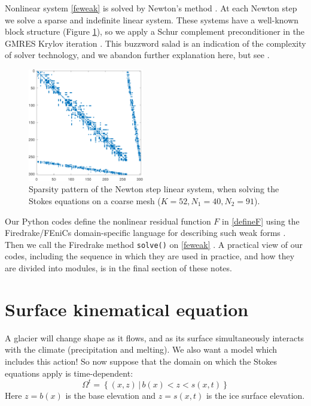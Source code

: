 \documentclass[letterpaper,final,12pt,reqno]{amsart}
\begin{document}
Nonlinear system \eqref{feweak} is solved by Newton's method \cite{Bueler2021,Kelley2003}.  At each Newton step we solve a sparse and indefinite linear system.  These systems have a well-known block structure (Figure \ref{fig:lowspy}), so we apply a Schur complement preconditioner in the GMRES Krylov iteration \cite{Elmanetal2014,GolubVanLoan2013}.  This buzzword salad is an indication of the complexity of solver technology, and we abandon further explanation here, but see \cite[Chapter 14]{Bueler2021}.

\begin{figure}[h]
\includegraphics[width=0.45\textwidth]{lowspy}
\caption{Sparsity pattern of the Newton step linear system, when solving the Stokes equations on a coarse mesh ($K=52,N_1=40,N_2=91$).}
\label{fig:lowspy}
\end{figure}

Our Python codes define the nonlinear residual function $F$ in \eqref{defineF} using the Firedrake/FEniCs domain-specific language for describing such weak forms \cite{Alnaesetal2014}.  Then we call the Firedrake method \texttt{solve()} on \eqref{feweak} \cite{Rathgeberetal2016}.  A practical view of our codes, including the sequence in which they are used in practice, and how they are divided into modules, is in the final section of these notes.


\section{Surface kinematical equation} \label{sec:kinematical}

A glacier will change shape as it flows, and as its surface simultaneously interacts with the climate (precipitation and melting).  We also want a model which includes this action!  So now suppose that the domain on which the Stokes equations apply is time-dependent:
\begin{equation}
\Omega^t = \left\{(x,z)\,\big|\, b(x) < z < s(x,t)\right\}  \label{Omegat}
\end{equation}
Here $z=b(x)$ is the base elevation and $z=s(x,t)$ is the ice surface elevation.
\end{document}
